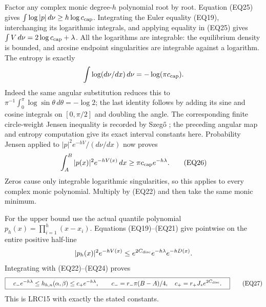 Factor any complex monic degree-\(h\) polynomial root by root.
Equation (EQ25) gives \(\int\log|p|\,d\nu\ge h\log c_{\rm cap}\).
Integrating the Euler equality (EQ19), interchanging its logarithmic
integrals, and applying equality in (EQ25) gives
\(\int V\,d\nu=2\log c_{\rm cap}+\lambda\).
All the logarithms are integrable: the equilibrium density is bounded,
and arcsine endpoint singularities are integrable against a logarithm.
The entropy is exactly
\[
 \int\log(d\nu/dx)\,d\nu=-\log(\pi c_{\rm cap}).
\]
Indeed the same angular substitution reduces this to
\(\pi^{-1}\int_0^\pi\log\sin\theta\,d\theta=-\log2\);
the last identity follows by adding its sine and cosine integrals
on \([0,\pi/2]\) and doubling the angle.
The corresponding finite circle-weight Jensen inequality is recorded by
Szeg\H{o} \cite[\S12.3, eq.~(12.3.4), pp.~300--301]{human:szego1975};
the preceding angular map and entropy computation give its exact
interval constants here.  Probability Jensen applied to
\(|p|^2e^{-hV}/(d\nu/dx)\) now proves
\[
 \int_A^B|p(x)|^2e^{-hV(x)}\,dx
 \ge \pi c_{\rm cap} e^{-h\lambda}.
\tag{EQ26}
\]
Zeros cause only integrable logarithmic singularities, so this applies
to every complex monic polynomial.  Multiply by (EQ22) and then
take the same monic minimum.

For the upper bound use the actual quantile polynomial
\(p_h(x)=\prod_{i=1}^h(x-x_i)\).  Equations (EQ19)--(EQ21) give pointwise
on the entire positive half-line
\[
 |p_h(x)|^2e^{-hV(x)}
 \le e^{2C_{\rm disc}}e^{-h\lambda}e^{-hD(x)}.
\]
Integrating with (EQ22)--(EQ24) proves
\[
 \boxed{\quad
 c_-e^{-h\lambda}\le h_{h,n}(\alpha,\beta)
                \le c_+e^{-h\lambda},\qquad
 c_-=r_-\pi(B-A)/4,\quad
 c_+=r_+J_*e^{2C_{\rm disc}}.\quad}
\tag{EQ27}
\]
This is LRC15 with exactly the stated constants.


